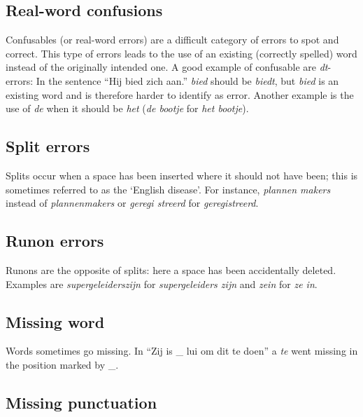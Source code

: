 \documentclass[a4paper,11pt]{article}
\begin{document}
\subsection{Real-word confusions}

Confusables (or real-word errors) are a difficult category of
errors to spot and correct. This type of errors leads to the use of an
existing (correctly spelled) word instead of the originally intended
one. A good example of confusable are \textit{dt}-errors: In the
sentence ``Hij bied zich aan.'' \emph{bied} should be \emph{biedt},
but \emph{bied} is an existing word and is therefore harder to
identify as error.  Another example is the use of \emph{de} when it
should be \emph{het} (\emph{de bootje} for \emph{het bootje}).

\subsection{Split errors}

Splits occur when a space has been inserted where it should not have
been; this is sometimes referred to as the `English disease'. For
instance, \emph{plannen makers} instead of \emph{plannenmakers} or
\emph{geregi streerd} for \emph{geregistreerd}.

\subsection{Runon errors}

Runons are the opposite of splits: here a space has been accidentally
deleted. Examples are \emph{supergeleiderszijn} for
\emph{supergeleiders zijn} and \emph{zein} for \emph{ze in}.

\subsection{Missing word}

Words sometimes go missing. In ``Zij is \_ lui om dit te doen'' a
\emph{te} went missing in the position marked by \_.

\subsection{Missing punctuation}
\end{document}
